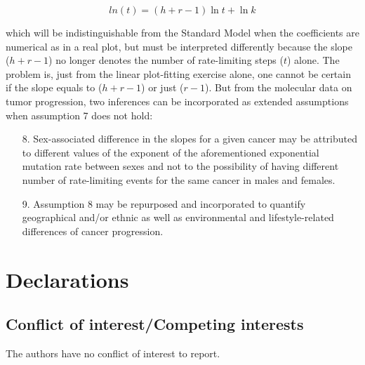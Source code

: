 \documentclass[lineno,sn-basic, Numbered]{sn-jnl}%
\theoremstyle{thmstyleone}%
\theoremstyle{thmstyletwo}%
\theoremstyle{thmstylethree}%
\begin{document}
\begin{equation}
    ln(t) = (h + r - 1) \ln t + \ln k 
\end{equation}

which will be indistinguishable from the Standard Model when the coefficients are numerical as in a real plot, but must be interpreted differently because the slope (\(h + r - 1\)) no longer denotes the number of rate-limiting steps (\(t\)) alone. The problem is, just from the linear plot-fitting exercise alone, one cannot be certain if the slope equals to (\(h + r - 1\)) or just (\(r - 1\)). But from the molecular data on tumor progression, two inferences can be incorporated as extended assumptions when assumption 7 does not hold:

\begin{itemize}
\item[8.] Sex-associated difference in the slopes for a given cancer may be attributed to different values of the exponent of the aforementioned exponential mutation rate between sexes and not to the possibility of having different number of rate-limiting events for the same cancer in males and females.
\item[9.] Assumption 8 may be repurposed and incorporated to quantify geographical and/or ethnic as well as environmental and lifestyle-related differences of cancer progression.
\end{itemize}


 


\backmatter





\section*{Declarations}

\subsection{Conflict of interest/Competing interests}

The authors have no conflict of interest to report.

\end{document}
